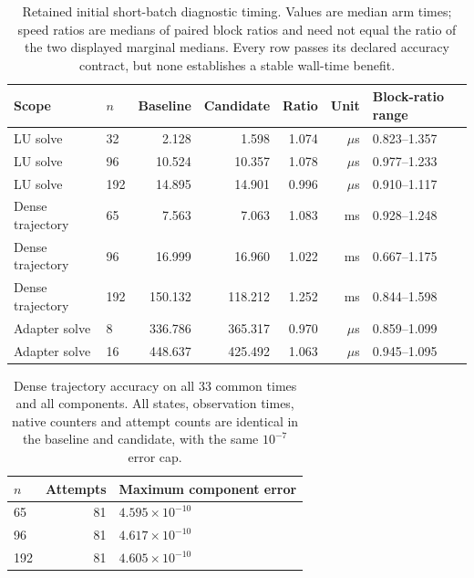 \begin{table}[t]
\caption{Retained initial short-batch diagnostic timing. Values are median arm times;
speed ratios are medians of paired block ratios and need not equal the ratio
of the two displayed marginal medians. Every row passes its declared accuracy contract,
but none establishes a stable wall-time benefit.}
\label{tab:timing}
\begin{ruledtabular}
\begin{tabular}{llrrrrl}
Scope & $n$ & Baseline & Candidate & Ratio & Unit & Block-ratio range\\
\hline
LU solve & 32 & 2.128 & 1.598 & 1.074 & $\mu$s & 0.823--1.357 \\
LU solve & 96 & 10.524 & 10.357 & 1.078 & $\mu$s & 0.977--1.233 \\
LU solve & 192 & 14.895 & 14.901 & 0.996 & $\mu$s & 0.910--1.117 \\
Dense trajectory & 65 & 7.563 & 7.063 & 1.083 & ms & 0.928--1.248 \\
Dense trajectory & 96 & 16.999 & 16.960 & 1.022 & ms & 0.667--1.175 \\
Dense trajectory & 192 & 150.132 & 118.212 & 1.252 & ms & 0.844--1.598 \\
Adapter solve & 8 & 336.786 & 365.317 & 0.970 & $\mu$s & 0.859--1.099 \\
Adapter solve & 16 & 448.637 & 425.492 & 1.063 & $\mu$s & 0.945--1.095 \\
\end{tabular}
\end{ruledtabular}
\end{table}
\begin{table}[b]
\caption{Dense trajectory accuracy on all 33 common times and all components.
All states, observation times, native counters and attempt counts are identical
in the baseline and candidate, with the same $10^{-7}$ error cap.}
\label{tab:dense-accuracy}
\begin{ruledtabular}
\begin{tabular}{lrl}
$n$ & Attempts & Maximum component error\\
\hline
65 & 81 & $4.595\times10^{-10}$ \\
96 & 81 & $4.617\times10^{-10}$ \\
192 & 81 & $4.605\times10^{-10}$ \\
\end{tabular}
\end{ruledtabular}
\end{table}

